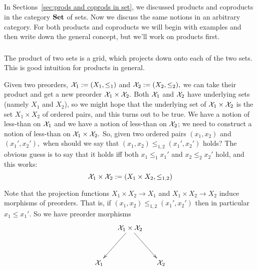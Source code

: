 \documentclass[../main/CT4S-EN-RU]{subfiles}
\begin{document}

\subsection{}

\begin{blockENG}
In Sections~\ref{sec:prods and coprods in set}, we discussed products and coproducts in the category ${\mathbf{Set}}$ of sets. Now we discuss the same notions in an arbitrary category. For both products and coproducts we will begin with examples and then write down the general concept, but we'll work on products first.
\end{blockENG}

\begin{blockRUS}
\end{blockRUS}


\subsubsection{}

\begin{blockENG}
The product of two sets is a grid, which projects down onto each of the two sets. This is good intuition for products in general.
\end{blockENG}

\begin{blockRUS}
\end{blockRUS}

\begin{exampleENG}\label{ex:product of preorders}
Given two preorders, $\mathcal{X}_1:=(X_1,\leq_1)$ and $\mathcal{X}_2:=(X_2,\leq_2),$ we can take their product and get a new preorder $\mathcal{X}_1\times\mathcal{X}_2.$ Both $\mathcal{X}_1$ and $\mathcal{X}_2$ have underlying sets (namely $X_1$ and $X_2$), so we might hope that the underlying set of $\mathcal{X}_1\times\mathcal{X}_2$ is the set $X_1\times X_2$ of ordered pairs, and this turns out to be true. We have a notion of less-than on $\mathcal{X}_1$ and we have a notion of less-than on $\mathcal{X}_2$; we need to construct a notion of less-than on $\mathcal{X}_1\times\mathcal{X}_2.$ So, given two ordered pairs $(x_1,x_2)$ and $(x_1',x_2'),$ when should we say that $(x_1,x_2)\leq_{1,2}(x_1',x_2')$ holds? The obvious guess is to say that it holds iff both $x_1\leq_1x_1'$ and $x_2\leq_2x_2'$ hold, and this works:
$$\mathcal{X}_1\times\mathcal{X}_2:=(X_1\times X_2,\leq_{1,2})$$

Note that the projection functions $X_1\times X_2\to X_1$ and $X_1\times X_2\to X_2$ induce morphisms of preorders. That is, if $(x_1,x_2)\leq_{1,2}(x_1',x_2')$ then in particular $x_1\leq x_1'.$ So we have preorder morphisms
$$\xymatrix@=15pt{&\mcX_1\times\mcX_2\ar[ldd]\ar[rdd]\\\\\mcX_1&&\mcX_2}$$
\end{exampleENG}
\end{document}
